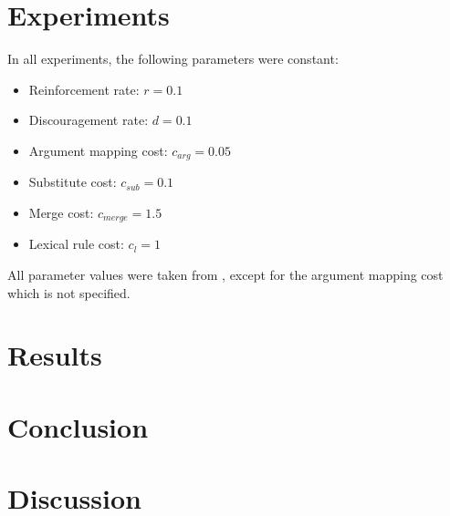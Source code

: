 \documentclass[a4paper]{article}
\begin{document}
\section{Experiments}
\label{sec:experiments}
In all experiments, the following parameters were constant:
\begin{itemize}
\item Reinforcement rate: $r = 0.1$
\item Discouragement rate: $d = 0.1$
\item Argument mapping cost: $c_{arg} = 0.05$
\item Substitute cost: $c_{sub} = 0.1$
\item Merge cost: $c_{merge} = 1.5$
\item Lexical rule cost: $c_l = 1$
\end{itemize}
All parameter values were taken from \cite{batali1999negotiation}, except for the argument mapping cost which is not specified.

\section{Results}
\label{sec:results}
\section{Conclusion}
\label{sec:conclusion}
\section{Discussion}
\label{sec:discussion}



\end{document}

